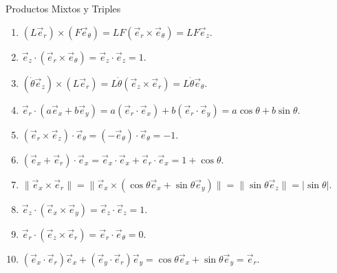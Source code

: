 \begin{solucion}{Productos Mixtos y Triples}
\begin{enumerate}
    \item $(L\vec{e}_r) \times (F\vec{e}_\theta) = LF(\vec{e}_r \times \vec{e}_\theta) = LF\vec{e}_z$.
    \item $\vec{e}_z \cdot (\vec{e}_r \times \vec{e}_\theta) = \vec{e}_z \cdot \vec{e}_z = 1$.
    \item $(\dot{\theta}\vec{e}_z) \times (L\vec{e}_r) = L\dot{\theta}(\vec{e}_z \times \vec{e}_r) = L\dot{\theta}\vec{e}_\theta$.
    \item $\vec{e}_r \cdot (a\vec{e}_x + b\vec{e}_y) = a(\vec{e}_r \cdot \vec{e}_x) + b(\vec{e}_r \cdot \vec{e}_y) = a\cos\theta + b\sin\theta$.
    \item $(\vec{e}_r \times \vec{e}_z) \cdot \vec{e}_\theta = (-\vec{e}_\theta) \cdot \vec{e}_\theta = -1$.
    \item $(\vec{e}_x + \vec{e}_r) \cdot \vec{e}_x = \vec{e}_x \cdot \vec{e}_x + \vec{e}_r \cdot \vec{e}_x = 1 + \cos\theta$.
    \item $\| \vec{e}_x \times \vec{e}_r \| = \| \vec{e}_x \times (\cos\theta\vec{e}_x + \sin\theta\vec{e}_y) \| = \| \sin\theta\vec{e}_z \| = |\sin\theta|$.
    \item $\vec{e}_z \cdot (\vec{e}_x \times \vec{e}_y) = \vec{e}_z \cdot \vec{e}_z = 1$.
    \item $\vec{e}_r \cdot (\vec{e}_z \times \vec{e}_r) = \vec{e}_r \cdot \vec{e}_\theta = 0$.
    \item $(\vec{e}_x \cdot \vec{e}_r) \vec{e}_x + (\vec{e}_y \cdot \vec{e}_r) \vec{e}_y = \cos\theta\vec{e}_x + \sin\theta\vec{e}_y = \vec{e}_r$.
\end{enumerate}
\end{solucion}
